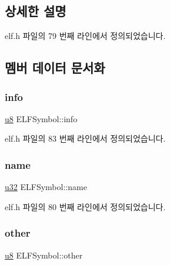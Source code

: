 \subsection{상세한 설명}


elf.\+h 파일의 79 번째 라인에서 정의되었습니다.



\subsection{멤버 데이터 문서화}
\mbox{\label{struct_e_l_f_symbol_a9cde1ecfa1e072a05540d6ffbb325335}} 
\subsubsection{\texorpdfstring{info}{info}}
{\footnotesize\ttfamily \mbox{\hyperlink{_system_8h_aed742c436da53c1080638ce6ef7d13de}{u8}} E\+L\+F\+Symbol\+::info}



elf.\+h 파일의 83 번째 라인에서 정의되었습니다.

\mbox{\label{struct_e_l_f_symbol_a976a529631ba267687dbd10db51c7d7f}} 
\subsubsection{\texorpdfstring{name}{name}}
{\footnotesize\ttfamily \mbox{\hyperlink{_system_8h_a10e94b422ef0c20dcdec20d31a1f5049}{u32}} E\+L\+F\+Symbol\+::name}



elf.\+h 파일의 80 번째 라인에서 정의되었습니다.

\mbox{\label{struct_e_l_f_symbol_a2ef76e3d315db14d758abd8e30235f8a}} 
\subsubsection{\texorpdfstring{other}{other}}
{\footnotesize\ttfamily \mbox{\hyperlink{_system_8h_aed742c436da53c1080638ce6ef7d13de}{u8}} E\+L\+F\+Symbol\+::other}



